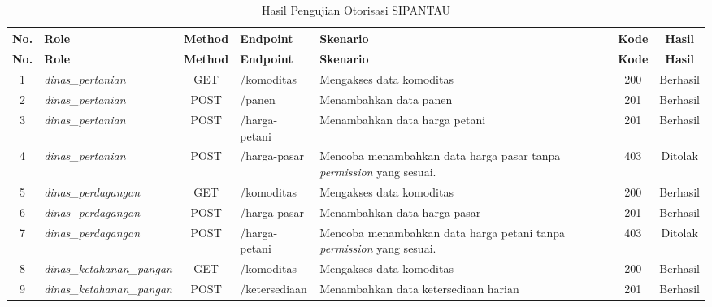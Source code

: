 \begin{longtable}{|c|p{2.4cm}|c|p{2.3cm}|p{2.4cm}|c|c|}
\caption{Hasil Pengujian Otorisasi SIPANTAU}
\label{tab:pengujian-otorisasi} \\
\hline
\textbf{No.} & \textbf{Role} & \textbf{Method} & \textbf{Endpoint} & \textbf{Skenario} & \textbf{Kode} & \textbf{Hasil} \\
\hline
\endfirsthead

\hline
\textbf{No.} & \textbf{Role} & \textbf{Method} & \textbf{Endpoint} & \textbf{Skenario} & \textbf{Kode} & \textbf{Hasil} \\
\hline
\endhead

1 & \textit{dinas\allowbreak \_pertanian} & GET & /komoditas &
Mengakses data komoditas &
200 & Berhasil \\ \hline

2 & \textit{dinas\allowbreak \_pertanian} & POST & /panen &
Menambahkan data panen &
201 & Berhasil \\ \hline

3 & \textit{dinas\allowbreak \_pertanian} & POST & /harga-petani &
Menambahkan data harga petani &
201 & Berhasil \\ \hline

4 & \textit{dinas\allowbreak \_pertanian} & POST & /harga-pasar &
Mencoba menambahkan data harga pasar tanpa \textit{permission} yang sesuai. &
403 & Ditolak \\ \hline

5 & \textit{dinas\allowbreak \_perdagangan} & GET & /komoditas &
Mengakses data komoditas &
200 & Berhasil \\ \hline

6 & \textit{dinas\allowbreak \_perdagangan} & POST & /harga-pasar &
Menambahkan data harga pasar &
201 & Berhasil \\ \hline

7 & \textit{dinas\allowbreak \_perdagangan} & POST & /harga-petani &
Mencoba menambahkan data harga petani tanpa \textit{permission} yang sesuai. &
403 & Ditolak \\ \hline

8 & \textit{dinas\allowbreak \_ketahanan\allowbreak \_pangan} & GET & /komoditas &
Mengakses data komoditas &
200 & Berhasil \\ \hline

9 & \textit{dinas\allowbreak \_ketahanan\allowbreak \_pangan} & POST & /ketersediaan &
Menambahkan data ketersediaan harian &
201 & Berhasil \\ \hline


\end{longtable}
